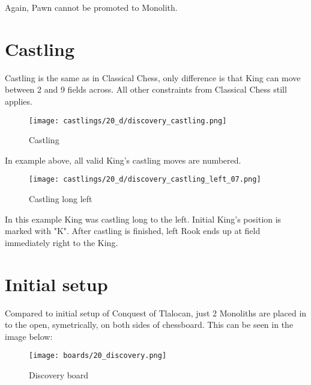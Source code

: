 Again, Pawn cannot be promoted to Monolith.

\clearpage %

\section*{Castling}

Castling is the same as in Classical Chess, only difference is that King can move between 2 and 9 fields across.
All other constraints from Classical Chess still applies.

\noindent
\begin{figure}[!h]
\texttt{[image: castlings/20\_d/discovery\_castling.png]}
\caption{Castling}
\label{fig:discovery_castling}
\end{figure}

In example above, all valid King's castling moves are numbered.

\noindent
\begin{figure}[!h]
\texttt{[image: castlings/20\_d/discovery\_castling\_left\_07.png]}
\caption{Castling long left}
\label{fig:discovery_castling_left_07}
\end{figure}

In this example King was castling long to the left. Initial King's position is marked with "K".
After castling is finished, left Rook ends up at field immediately right to the King.

\clearpage %

\section*{Initial setup}

Compared to initial setup of Conquest of Tlalocan, just 2 Monoliths are placed in to the open,
symetrically, on both sides of chessboard. This can be seen in the image below:

\noindent
\begin{figure}[h]
\texttt{[image: boards/20\_discovery.png]}
\caption{Discovery board}
\label{fig:20_discovery}
\end{figure}

\clearpage %
